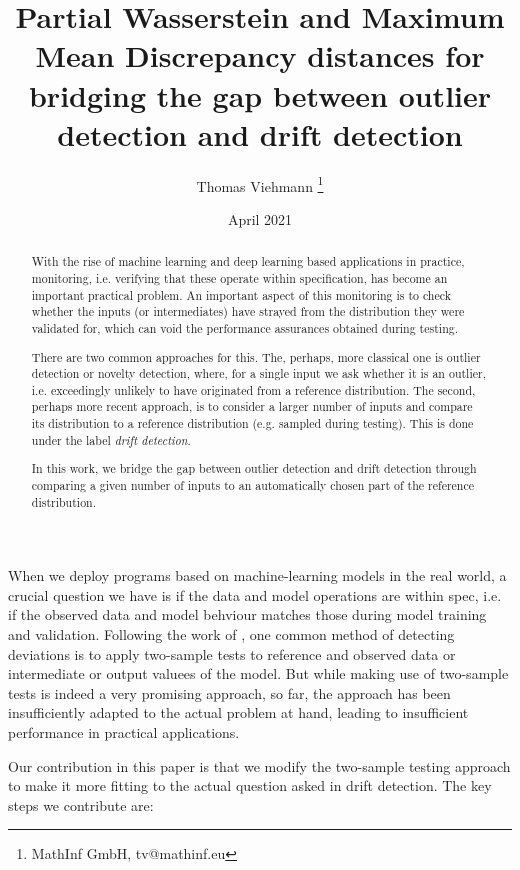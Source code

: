 \documentclass[a4paper,twoside,10pt]{article}
\date{}
\title{Partial Wasserstein and Maximum Mean Discrepancy distances for bridging the gap between outlier detection and drift detection}
\author{Thomas Viehmann
\thanks{MathInf GmbH, tv@mathinf.eu}
}
\date{April 2021}
\theoremstyle{plain}
\theoremstyle{remark}
\begin{document}
\maketitle

\begin{abstract}
  With the rise of machine learning and deep learning based applications in practice, monitoring, i.e. verifying that these operate within specification, has become an important practical problem.
  An important aspect of this monitoring is to check whether the inputs (or intermediates) have strayed from the distribution they were validated for, which can void the performance assurances obtained during testing.
  
  There are two common approaches for this. The, perhaps, more classical one is outlier detection or novelty detection, where, for a single input we ask whether it is an outlier, i.e. exceedingly unlikely to have originated from a reference distribution. The second, perhaps more recent approach, is to consider a larger number of inputs and compare its distribution to a reference distribution (e.g. sampled during testing). This is done under the label \textit{drift detection}.

  In this work, we bridge the gap between outlier detection and drift detection through comparing a given number of inputs to an automatically chosen part of the reference distribution.
\end{abstract}


When we deploy programs based on machine-learning models in the real world, a crucial question we have is if the data and model operations are within spec, i.e. if the observed data and model behviour matches those during model training and validation. Following the work of \cite{FailingLoudly}, one common method of detecting deviations is to apply two-sample tests to reference and observed data or intermediate or output valuees of the model. But while making use of two-sample tests is indeed a very promising approach, so far, the approach has been insufficiently adapted to the actual problem at hand, leading to insufficient performance in practical applications.

Our contribution in this paper is that we modify the two-sample testing approach to make it more fitting to the actual question asked in drift detection. The key steps we contribute are:
\end{document}
